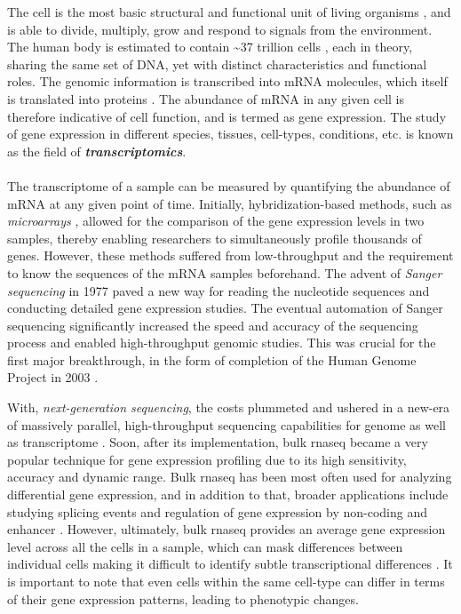 The cell is the most basic structural and functional unit of living organisms \textbf{\cite{regev_human_nodate}}, and is able to divide, multiply, grow and respond to signals from the environment. The human body is estimated to contain \textasciitilde37 trillion cells \textbf{\cite{wen_recent_2022}}, each in theory, sharing the same set of DNA, yet with distinct characteristics and functional roles. The genomic information is transcribed into mRNA molecules, which itself is translated into proteins \textbf{\cite{costa_uncovering_2010}}. The abundance of mRNA in any given cell is therefore indicative of cell function, and is termed as gene expression. The study of gene expression in different species, tissues, cell-types, conditions, etc. is known as the field of \textit{\textbf{transcriptomics}}.\\\\
The transcriptome of a sample can be measured by quantifying the abundance of mRNA at any given point of time. Initially, hybridization-based methods, such as \textit{microarrays} \textbf{\cite{lockhart_expression_1996,schena_quantitative_1995}}, allowed for the comparison of the gene expression levels in two samples, thereby enabling researchers to simultaneously profile thousands of genes. However, these methods suffered from low-throughput and the requirement to know the sequences of the mRNA samples beforehand. The advent of \textit{Sanger sequencing} in 1977 \textbf{\cite{sanger_dna_1977}} paved a new way for reading the nucleotide sequences and conducting detailed gene expression studies. The eventual automation of Sanger sequencing significantly increased the speed and accuracy of the sequencing process and enabled high-throughput genomic studies. This was crucial for the first major breakthrough, in the form of completion of the Human Genome Project in 2003 \textbf{\cite{collins_human_2003}}.\\
\par With, \textit{next-generation sequencing}, the costs plummeted and ushered in a new-era of massively parallel, high-throughput sequencing capabilities for genome as well as transcriptome \textbf{\cite{voelkerding_next-generation_2009}}. Soon, after its implementation, bulk \gls{rnaseq} became a very popular technique for gene expression profiling due to its high sensitivity, accuracy and dynamic range. Bulk \gls{rnaseq} has been most often used for analyzing differential gene expression, and in addition to that, broader applications include studying splicing events and regulation of gene expression by non-coding and enhancer  \textbf{\cite{stark_rna_2019}}. However, ultimately, bulk \gls{rnaseq} provides an average gene expression level across all the cells in a sample, which can mask differences between individual cells making it difficult to identify subtle transcriptional differences \textbf{\cite{kalisky_brief_2018}}. It is important to note that even cells within the same cell-type can differ in terms of their gene expression patterns, leading to phenotypic changes. %
